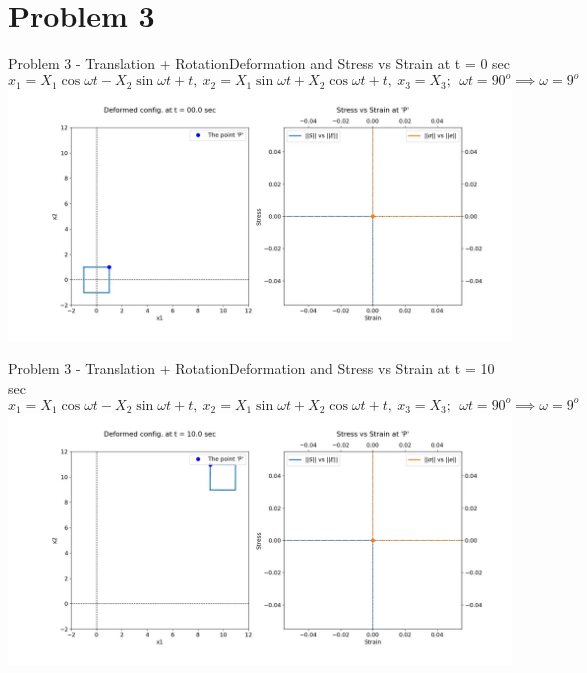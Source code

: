 \documentclass{beamer}
\begin{document}
\section{Problem 3}

\begin{frame}{Problem 3 - Translation + Rotation}{Deformation and Stress vs Strain at t = 0 sec}
    \vspace{-2em}
    \scriptsize $$x_1 = X_1\cos\omega t - X_2\sin\omega t + t,\ x_2 = X_1\sin\omega t + X_2\cos\omega t + t,\ x_3 = X_3;\ \ \omega t = 90^o \implies \omega = 9^o$$
    \includegraphics[width=\textwidth, trim={4.5cm 2cm 3cm 1cm}, clip]{Plots/itrandrotation.jpg}
\end{frame}

\begin{frame}{Problem 3 - Translation + Rotation}{Deformation and Stress vs Strain at t = 10 sec}
    \vspace{-2em}
    \scriptsize $$x_1 = X_1\cos\omega t - X_2\sin\omega t + t,\ x_2 = X_1\sin\omega t + X_2\cos\omega t + t,\ x_3 = X_3;\ \ \omega t = 90^o \implies \omega = 9^o$$
    \includegraphics[width=\textwidth, trim={4.5cm 2cm 3cm 1cm}, clip]{Plots/trandrotation.jpg}
\end{frame}
\end{document}
